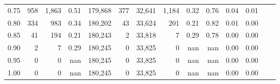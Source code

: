 \begin{tabular}{rrrrrrrrrrrrrr}
0.75 &     958 &  1,863 &    0.51 &  179,868 &      377 &  32,641 &   1,184 &  0.32 &  0.76 &  0.04 &      0.01 \\
0.80 &     334 &    983 &    0.34 &  180,202 &       43 &  33,624 &     201 &  0.21 &  0.82 &  0.01 &      0.00 \\
0.85 &      41 &    194 &    0.21 &  180,243 &        2 &  33,818 &       7 &  0.29 &  0.78 &  0.00 &      0.00 \\
0.90 &       2 &      7 &    0.29 &  180,245 &        0 &  33,825 &       0 &   nan &   nan &  0.00 &      0.00 \\
0.95 &       0 &      0 &     nan &  180,245 &        0 &  33,825 &       0 &   nan &   nan &  0.00 &      0.00 \\
1.00 &       0 &      0 &     nan &  180,245 &        0 &  33,825 &       0 &   nan &   nan &  0.00 &      0.00 \\
\bottomrule
\end{tabular}
